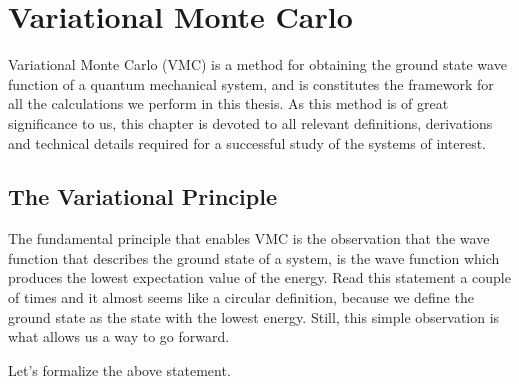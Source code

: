 \documentclass[Thesis.tex]{subfiles}
\begin{document}
\chapter{Variational Monte Carlo}

Variational Monte Carlo (VMC) is a method for obtaining the ground state wave function of
a quantum mechanical system, and is constitutes the framework for all the calculations we
perform in this thesis. As this method is of great significance to us, this chapter is
devoted to all relevant definitions, derivations and technical details required for a
successful study of the systems of interest. 


\section{The Variational Principle}

The fundamental principle that enables VMC is the observation that the wave function that
describes the ground state of a system, is the wave function which produces the lowest
expectation value of the energy. Read this statement a couple of times and it almost seems
like a circular definition, because we define the ground state as the state with the
lowest energy. Still, this simple observation is what allows us a way to go forward. 

Let's formalize the above statement.
\end{document}
